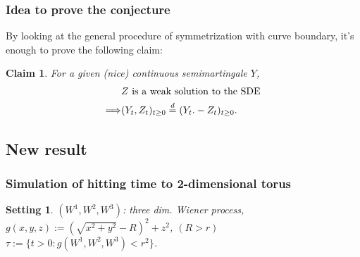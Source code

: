\documentclass[dvipdfmx,11pt]{beamer}		%
\newtheorem{set}[defi]{Setting}
\newtheorem{claim}[defi]{Claim}
\begin{document}
%
\begin{frame}\frametitle{Idea to prove the conjecture}
	By looking at the general procedure of symmetrization with curve boundary, it's enough to prove the following claim:
	\begin{claim}
		For a given (nice) continuous semimartingale \(Y\),
		\begin{align*}
			&\text{\( Z \) is a weak solution to the SDE}	\\
			\Longrightarrow &( Y_t, Z_t )_{t\ge0} \overset{d}{=} ( Y_t. -Z_t )_{t\ge0}	\text{.}
		\end{align*}
	\end{claim}
\end{frame}
%
\subsection{New result}
\begin{frame}\frametitle{Simulation of hitting time to 2-dimensional torus}
	\begin{set}
		\( (W^1,W^2,W^3) \): three dim. Wiener process,	\\
		\( g(x,y,z) := (\sqrt{x^2+y^2}-R)^2 + z^2 \), \( (R>r) \)	\\
		\( \tau := \{ t> 0 : g(W^1, W^2, W^3) < r^2 \} \).
	\end{set}
\end{frame}
%
\end{document}
